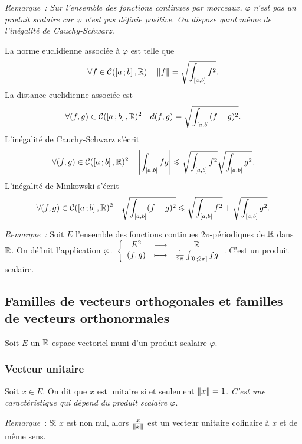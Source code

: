 \emph{Remarque~: Sur l'ensemble des fonctions continues par morceaux, $\varphi$ n'est pas un produit scalaire car $\varphi$ n'est pas définie positive. On dispose qand même de l'inégalité de Cauchy-Schwarz.}

La norme euclidienne associée à $\varphi$ est telle que
\begin{equation}
  \forall f \in \mathcal{C}(\left[ a \, ;  b \right],\mathbb{R}) \quad \left\lVert f\right\rVert=\sqrt{\int_{[a,b]}f^2}.
\end{equation}
La distance euclidienne associée est 
\begin{equation}
  \forall (f,g) \in \mathcal{C}(\left[ a \, ;  b \right],\mathbb{R})^2 \quad d(f,g)=\sqrt{\int_{[a,b]}(f-g)^2}.
\end{equation}
L'inégalité de Cauchy-Schwarz s'écrit
\begin{equation}
  \forall (f,g) \in \mathcal{C}(\left[ a \, ;  b \right],\mathbb{R})^2 \quad \left\lvert\int_{[a,b]}fg\right\rvert \leqslant \sqrt{\int_{[a,b]}f^2} \sqrt{\int_{[a,b]}g^2}.
\end{equation}
L'inégalité de Minkowski s'écrit
\begin{equation}
  \forall (f,g) \in \mathcal{C}(\left[ a \, ;  b \right],\mathbb{R})^2 \quad \sqrt{\int_{[a,b]}(f+g)^2} \leqslant \sqrt{\int_{[a,b]}f^2} + \sqrt{\int_{[a,b]}g^2}.
\end{equation}

\emph{Remarque~:} Soit $E$ l'ensemble des fonctions continues $2\pi$-périodiques de $\mathbb{R}$ dans $\mathbb{R}$. On définit l'application $\varphi\colon \left\{\begin{array}{ccc} E^2 & \longrightarrow &\mathbb{R}\\ (f,g) & \longmapsto & \frac{1}{2\pi}\int_{\left[ 0 \, ;  2\pi \right]}fg \end{array} \right.$. C'est un produit scalaire.

\subsection{Familles de vecteurs orthogonales et familles de vecteurs orthonormales}

Soit $E$ un $\mathbb{R}$-espace vectoriel muni d'un produit scalaire $\varphi$.

\subsubsection{Vecteur unitaire}

\begin{defdef}
  Soit $x \in E$. On dit que $x$ est unitaire si et seulement $\left\lVert x\right\rVert=1$. \emph{C'est une caractéristique qui dépend du produit scalaire $\varphi$}.
\end{defdef}

\emph{Remarque}~: Si $x$ est non nul, alors $\frac{x}{\left\lVert x\right\rVert}$ est un vecteur unitaire colinaire à $x$ et de même sens.

